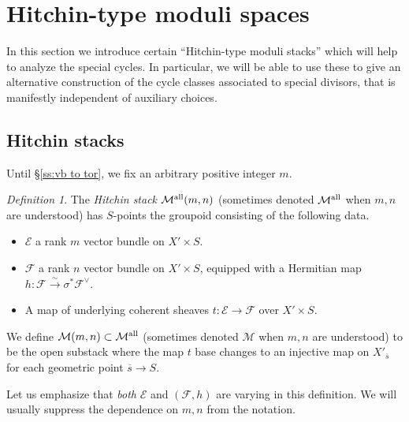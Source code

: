 \documentclass[reqno]{amsart}
\numberwithin{equation}{section}
\newcommand{\ol}[1]{\overline{#1}}
\newcommand{\Cal}[1]{\mathcal{#1}}
\newcommand{\co}{\colon}
\newcommand\cM{\mathcal{M}}
\theoremstyle{remark}
\newtheorem{defn}[thm]{Definition}
\numberwithin{equation}{section}
\begin{document}
\section{Hitchin-type moduli spaces}\label{sec: hitchin spaces}

In this section we introduce certain ``Hitchin-type moduli stacks'' which will help to analyze the special cycles. In particular, we will be able to use these to give an alternative construction of the cycle classes associated to special divisors, that is manifestly independent of auxiliary choices. 

\subsection{Hitchin stacks}\label{ssec: Hitchin stacks}
Until \S\ref{ss:vb to tor}, we fix an arbitrary positive integer $m$.

\begin{defn} The \emph{Hitchin stack} $\Cal{M}^{\rm all}(m,n)$ (sometimes denoted $\Cal{M}^{\rm all}$ when $m,n$ are understood) has $S$-points the groupoid consisting of the following data. 
\begin{itemize}
\item $\Cal{E}$ a rank $m$ vector bundle on $X' \times S$.
\item $\Cal{F}$ a rank $n$ vector bundle on $X' \times S$, equipped with a Hermitian map $h \co \Cal{F} \xrightarrow{\sim} \sigma^* \Cal{F}^{\vee}$. 
\item A map of underlying coherent sheaves $t \co \Cal{E} \rightarrow \Cal{F}$ over $X'\times S$.\end{itemize}
We define  $\cM(m,n)\subset\cM^{\rm all}$ (sometimes denoted $\Cal{M}$ when $m,n$ are understood) to be the open substack where the map $t$ base changes to an injective map on $X'_{\ol{s}}$ for each geometric point $\ol{s} \rightarrow S$. 
\end{defn}
Let us emphasize that \emph{both} $\Cal{E}$ and $(\Cal{F},h)$ are varying in this definition. We will usually suppress the dependence on $m,n$ from the notation. 
\end{document}
